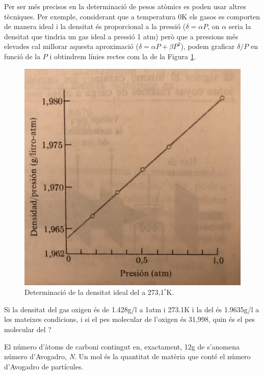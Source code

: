 Per ser més precisos en la determinació de pesos atòmics es poden usar altres tècniques. Per exemple, considerant que a temperatura 0K els gasos es comporten de manera ideal i la densitat és proporcional a la pressió ($\delta=\alpha P$, on $\alpha$ seria la densitat que tindria un gas ideal a pressió 1 atm) però que a pressions més elevades cal millorar aquesta aproximació ($\delta = \alpha P + \beta P^2$), podem graficar $\delta/P$ en funció de la $P$ i obtindrem línies rectes com la de la Figura \ref{fig:DensitatIdealCO2}.
\begin{figure}[h]
\centering
\includegraphics[scale=0.3]{figures/DensitatIdealCO2.png}
\caption{Determinació de la densitat ideal del  a 273,1$^º$K.}
\label{fig:DensitatIdealCO2}
\end{figure}
\begin{exr}
Si la densitat del gas oxigen és de 1.428g/l a 1atm i 273.1K i la del  és 1.9635g/l a les mateixes condicions, i si el pes molecular de l'oxigen és 31,998, quin és el pes molecular del ?
\end{exr}

\begin{mdframed}[backgroundcolor=gray!30,frametitle=Concepte de mol]
El número d'àtoms de carboni contingut en, exactament, 12g de  s'anomena número d'Avogadro, \emph{N}. Un mol és la quantitat de matèria que conté el número d'Avogadro de partícules.
\end{mdframed}

